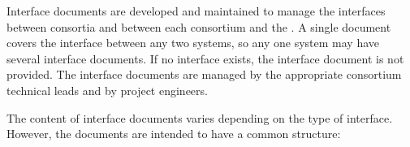 Interface documents are developed and maintained to manage the
interfaces between consortia and between each consortium and the
. A single document covers the interface between any two
systems, so any one system may have several interface documents. If no
interface exists, the interface document is not provided.  The
interface documents are managed by the appropriate consortium
technical leads and by  project engineers.

The content of interface documents varies depending on the type
of interface. However, the documents are intended to have
a common structure: 
\begin{comment}  Too wordy, copied below. Anne
\begin{enumerate}
 \item Definition: This section defines the interfacing systems.
 \item Hardware: In this section, the interfacing hardware components,
   electrical and mechanical, are defined in general terms. As an
   example, the \dword{apa} frame needs to support the \dword{pd}
   mounting brackets.
 \item Design: In this section, the dependencies in design
   methodology, sequence, and standards are described. Using the
   previous example, the design of the \dword{pd} mounting
   brackets depends on side tubes chosen for the \dword{apa}.
 \item Production: Component production and overall assembly is
   shared among interfacing systems. This section details who has what
   responsibilities.
 \item Testing: Like production, testing is a shared
   responsibility. In this section, responsibilities for testing and
   the required equipment are apportioned.
 \item Integration: The integration of systems into installable units
   before insertion into the cryostat is defined in this section. The
   location, methodology, tooling, and environment for integration are
   defined.
 \item Installation: Installation tasks and responsibilities, once
   installable units are assembled, are defined in this section. Any
   special transportation or installation tool or fixture is also
   defined.
 \item Commissioning: In this section, overall responsibilities for
   commissioning tasks are defined, and parameters are set.
 \item Data format, control, and error codes: Communications protocols,
   responses, and necessary actions are defined.
 \item Appendices: Technical figures and interfaces should be included
   in this section in as much detail as necessary. Block diagrams that
   show interconnections and detailed documentation of each connection
   are needed.
\end{enumerate}
\end{comment}
